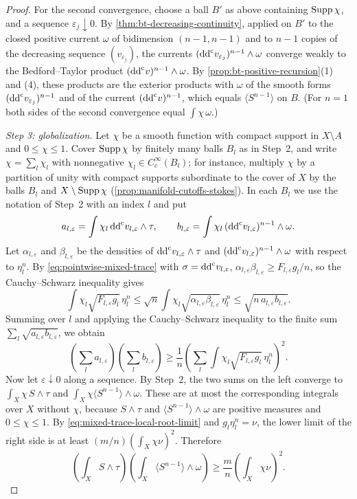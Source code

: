\begin{proof}
For the second convergence, choose a ball $B'$ as above containing $\operatorname{Supp}\chi$, and a sequence $\varepsilon_j\downarrow0$. By \cref{thm:bt-decreasing-continuity}, applied on $B'$ to the closed positive current $\omega$ of bidimension $(n-1,n-1)$ and to $n-1$ copies of the decreasing sequence $(v_{\varepsilon_j})$, the currents $(\mathrm{dd}^{\mathrm{c}} v_{\varepsilon_j})^{n-1}\wedge\omega$ converge weakly to the Bedford--Taylor product $(\mathrm{dd}^{\mathrm{c}} v)^{n-1}\wedge\omega$. By \cref{prop:bt-positive-recursion}(1) and (4), these products are the exterior products with $\omega$ of the smooth forms $(\mathrm{dd}^{\mathrm{c}} v_{\varepsilon_j})^{n-1}$ and of the current $(\mathrm{dd}^{\mathrm{c}} v)^{n-1}$, which equals $\langle S^{n-1}\rangle$ on $B$. (For $n=1$ both sides of the second convergence equal $\int\chi\,\omega$.)

\emph{Step 3: globalization.} Let $\chi$ be a smooth function with compact support in $X\setminus A$ and $0\leq\chi\leq1$. Cover $\operatorname{Supp}\chi$ by finitely many balls $B_l$ as in Step~2, and write $\chi=\sum_l\chi_l$ with nonnegative $\chi_l\in C^\infty_c(B_l)$; for instance, multiply $\chi$ by a partition of unity with compact supports subordinate to the cover of $X$ by the balls $B_l$ and $X\setminus\operatorname{Supp}\chi$ (\cref{prop:manifold-cutoffs-stokes}). In each $B_l$ we use the notation of Step~2 with an index $l$ and put
\[
 a_{l,\varepsilon}=\int\chi_l\,\mathrm{dd}^{\mathrm{c}} v_{l,\varepsilon}\wedge\tau,\qquad
 b_{l,\varepsilon}=\int\chi_l\,(\mathrm{dd}^{\mathrm{c}} v_{l,\varepsilon})^{n-1}\wedge\omega.
\]
Let $\alpha_{l,\varepsilon}$ and $\beta_{l,\varepsilon}$ be the densities of $\mathrm{dd}^{\mathrm{c}} v_{l,\varepsilon}\wedge\tau$ and $(\mathrm{dd}^{\mathrm{c}} v_{l,\varepsilon})^{n-1}\wedge\omega$ with respect to $\eta_l^n$. By \eqref{eq:pointwise-mixed-trace} with $\sigma=\mathrm{dd}^{\mathrm{c}} v_{l,\varepsilon}$, $\alpha_{l,\varepsilon}\beta_{l,\varepsilon}\geq F_{l,\varepsilon}g_l/n$, so the Cauchy--Schwarz inequality gives
\[
 \int\chi_l\sqrt{F_{l,\varepsilon}g_l}\,\eta_l^n
   \leq\sqrt n\int\chi_l\sqrt{\alpha_{l,\varepsilon}\beta_{l,\varepsilon}}\,\eta_l^n
   \leq\sqrt{n\,a_{l,\varepsilon}b_{l,\varepsilon}}.
\]
Summing over $l$ and applying the Cauchy--Schwarz inequality to the finite sum $\sum_l\sqrt{a_{l,\varepsilon}b_{l,\varepsilon}}$, we obtain
\[
 \left(\sum_l a_{l,\varepsilon}\right)
 \left(\sum_l b_{l,\varepsilon}\right)
 \geq\frac1n\left(\sum_l
       \int\chi_l\sqrt{F_{l,\varepsilon}g_l}\,\eta_l^n\right)^2.
\]
Now let $\varepsilon\downarrow0$ along a sequence. By Step~2, the two sums on the left converge to $\int_X\chi\,S\wedge\tau$ and $\int_X\chi\langle S^{n-1}\rangle\wedge\omega$. These are at most the corresponding integrals over $X$ without $\chi$, because $S\wedge\tau$ and $\langle S^{n-1}\rangle\wedge\omega$ are positive measures and $0\leq\chi\leq1$. By \eqref{eq:mixed-trace-local-root-limit} and $g_l\eta_l^n=\nu$, the lower limit of the right side is at least $(m/n)(\int_X\chi\nu)^2$. Therefore
\[
 \left(\int_X S\wedge\tau\right)
 \left(\int_X\langle S^{n-1}\rangle\wedge\omega\right)
 \geq\frac mn\left(\int_X\chi\nu\right)^2.
\]


\end{proof}
